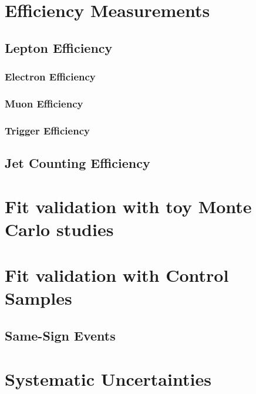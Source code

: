 \documentclass{cmspaper}
\begin{document}
\section{Efficiency Measurements}
     \label{sec:alleff}
     \subsection{Lepton Efficiency}
       \label{sec:efficiency}
	 \subsubsection{Electron Efficiency}
	   \label{sec:eff_electron}
	 \subsubsection{Muon Efficiency}
	   \label{sec:eff_muon}
	 \subsubsection{Trigger Efficiency}
	   \label{sec:eff_trigger}
     \subsection{Jet Counting Efficiency}

\clearpage
\section{Fit validation with toy Monte Carlo studies}
   

\section{Fit validation with Control Samples}
	 \subsection{Same-Sign Events}
	   \label{sec:fitvalidation_ss}


\section{Systematic Uncertainties}
   \label{sec:systematics}

\newpage 
\end{document}
